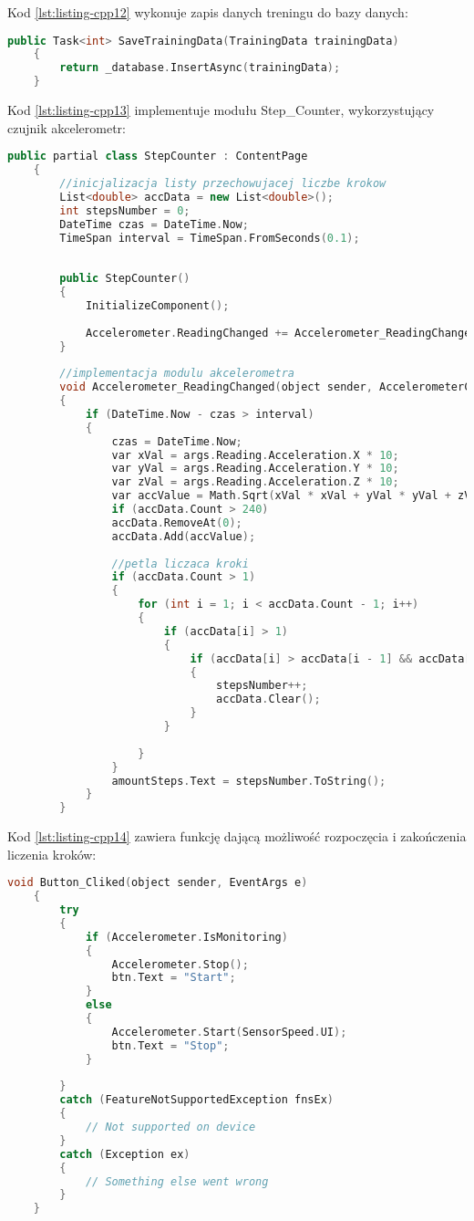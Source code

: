 Kod \ref{lst:listing-cpp12} wykonuje zapis danych treningu do bazy danych:
\begin{lstlisting}[caption=Zapis danych do bazy danych, label={lst:listing-cpp12}, language=C++]
	public Task<int> SaveTrainingData(TrainingData trainingData)      
	{
		return _database.InsertAsync(trainingData);
	}
\end{lstlisting}

Kod \ref{lst:listing-cpp13} implementuje modułu Step\_Counter, wykorzystujący czujnik akcelerometr:
\begin{lstlisting}[caption=Krakomierz i akcelerometr, label={lst:listing-cpp13}, language=C++]
	public partial class StepCounter : ContentPage
	{
		//inicjalizacja listy przechowujacej liczbe krokow
		List<double> accData = new List<double>();
		int stepsNumber = 0;
		DateTime czas = DateTime.Now;
		TimeSpan interval = TimeSpan.FromSeconds(0.1);
		
		
		public StepCounter()
		{
			InitializeComponent();
			
			Accelerometer.ReadingChanged += Accelerometer_ReadingChanged;
		}
		
		//implementacja modulu akcelerometra
		void Accelerometer_ReadingChanged(object sender, AccelerometerChangedEventArgs args)
		{
			if (DateTime.Now - czas > interval)
			{
				czas = DateTime.Now;
				var xVal = args.Reading.Acceleration.X * 10;
				var yVal = args.Reading.Acceleration.Y * 10;
				var zVal = args.Reading.Acceleration.Z * 10;
				var accValue = Math.Sqrt(xVal * xVal + yVal * yVal + zVal * zVal) - 10;
				if (accData.Count > 240)
				accData.RemoveAt(0);
				accData.Add(accValue);
				
				//petla liczaca kroki
				if (accData.Count > 1)
				{
					for (int i = 1; i < accData.Count - 1; i++)
					{
						if (accData[i] > 1)
						{
							if (accData[i] > accData[i - 1] && accData[i] > accData[i + 1])
							{
								stepsNumber++;
								accData.Clear();
							}
						}
						
					}
				}
				amountSteps.Text = stepsNumber.ToString();
			}
		}
\end{lstlisting}

Kod \ref{lst:listing-cpp14} zawiera funkcję dającą możliwość rozpoczęcia i zakończenia liczenia kroków:
\begin{lstlisting}[caption=Rozpoczęcia i zakończenie liczenia kroków, label={lst:listing-cpp14}, language=C++]
	void Button_Cliked(object sender, EventArgs e) 
	{
		try
		{
			if (Accelerometer.IsMonitoring)
			{
				Accelerometer.Stop();
				btn.Text = "Start";
			}   
			else
			{
				Accelerometer.Start(SensorSpeed.UI);
				btn.Text = "Stop";
			}
			
		}
		catch (FeatureNotSupportedException fnsEx)
		{
			// Not supported on device
		}
		catch (Exception ex)
		{
			// Something else went wrong
		}
	}
\end{lstlisting}